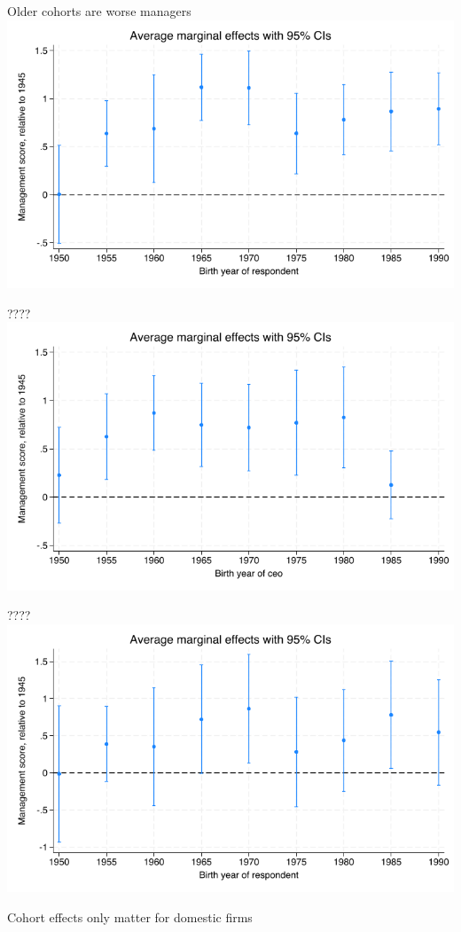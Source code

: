 \documentclass[
  ignorenonframetext,
  aspectratio=1610,
]{beamer}
\begin{document}
\begin{frame}{Older cohorts are worse managers}
\protect\hypertarget{older-cohorts-are-worse-managers}{}
\includegraphics{fig/cohort-respondent-marginsplot.png}
\end{frame}

\begin{frame}{????}
\protect\hypertarget{section}{}
\includegraphics{fig/cohort-ceo-marginsplot.png}
\end{frame}

\begin{frame}{????}
\protect\hypertarget{section-1}{}
\includegraphics{fig/cohort-respcontrol-marginsplot.png}
\end{frame}

\begin{frame}{Cohort effects only matter for domestic firms}
\protect\hypertarget{cohort-effects-only-matter-for-domestic-firms}{}
\end{frame}
\end{document}
